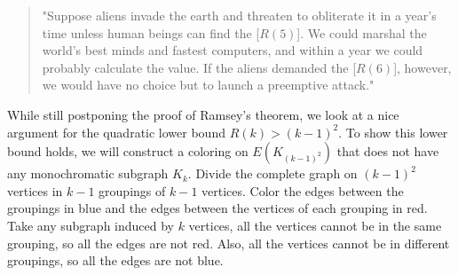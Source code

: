 \documentclass{tufte-handout}
\theoremstyle{definition}
\theoremstyle{remark}
\begin{document}
\begin{quote}
	"Suppose aliens invade the earth and threaten to obliterate it in a year's time unless human beings can find the [$R(5)$]. We could marshal the world's best minds and fastest computers, and within a year we could probably calculate the value. If the aliens demanded the [$R(6)$], however, we would have no choice but to launch a preemptive attack."
\end{quote}

While still postponing the proof of Ramsey's theorem, we look at a nice argument for the quadratic lower bound $R(k) > (k-1)^2$. To show this lower bound holds, we will construct a coloring on $E(K_{(k-1)^2})$ that does not have any monochromatic subgraph $K_k$. Divide the complete graph on $(k-1)^2$ vertices in $k-1$ groupings of $k-1$ vertices. Color the edges between the groupings in blue and the edges between the vertices of each grouping in red. Take any subgraph induced by $k$ vertices, all the vertices cannot be in the same grouping, so all the edges are not red. Also, all the vertices cannot be in different groupings, so all the edges are not blue.
\end{document}
